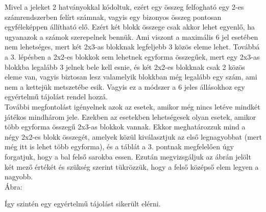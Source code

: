\documentclass[a4paper, 11pt]{article}
\begin{document}
\indent Mivel a jeleket 2 hatványokkal kódoltuk, ezért egy összeg felfogható egy 2-es számrendszerben felírt számnak, vagyis egy bizonyos összeg pontosan egyféleképpen állítható elő. Ezért két blokk összege csak akkor lehet egyenlő, ha ugyanazok a számok szerepelnek bennük. Ami viszont a maximális 6 jel esetében nem lehetséges, mert két 2x3-as blokknak legfeljebb 3 közös eleme lehet. Továbbá a 3. lépésben a 2x2-es blokkok sem lehetnek egyforma összegűek, mert egy 2x3-as blokkba legalább 3 jelnek bele kell esnie, és két 2x2-es blokknak csak 2 közös eleme van, vagyis biztosan lesz valamelyik blokkban még legalább egy szám, ami nem a kettejük metszetébe esik. Vagyis ez a módszer a 6 jeles állásokhoz egy egyértelmű tájolást rendel hozzá. \\
\indent További megfontolást igényelnek azok az esetek, amikor még nincs letéve mindkét játékos mindhárom jele. Ezekben az esetekben lehetségesek olyan esetek, amikor több egyforma összegű 2x3-as blokkok vannak. Ekkor meghatározzuk mind a négy 2x2-es blokk összegét, amelyek közül kiválasztjuk az első legnagyobbat (mert még itt is lehet több egyforma), és a táblát a 3. pontnak megfelelően úgy forgatjuk, hogy a bal felső sarokba essen. Ezután megvizsgáljuk az ábrán jelölt két mező értékét és szükség szerint tükrözzük, hogy a felső középső elem legyen a nagyobb. \\
Ábra:
    \begin{center}
    \end{center}
Így szintén egy egyértelmű tájolást sikerült elérni.
\end{document}
